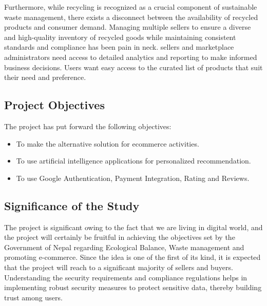 \documentclass[12pt, a4paper, oneside]{article}
\begin{document}
Furthermore, while recycling is recognized as a crucial component of sustainable waste management, there exists a disconnect between the availability of recycled products and consumer demand. Managing multiple sellers to ensure a diverse and high-quality inventory of recycled goods while maintaining consistent standards and compliance has been pain in neck.
sellers and marketplace administrators need access to detailed analytics and reporting to make informed business decisions. Users want easy access to the curated list of products that suit their need and preference.

\pagebreak
\subsection{Project Objectives}
The project has put forward the following objectives:

\begin{itemize}
	\item To make the alternative solution for ecommerce activities.
		\item{ To use artificial intelligence applications for personalized recommendation.}

	 
\item{To use Google Authentication, Payment Integration, Rating and Reviews.}

\end{itemize}

\pagebreak
\subsection{Significance of the Study}
The project is significant owing to the fact that we are living in digital world, and the project will certainly be fruitful in achieving the objectives set by the Government of Nepal regarding Ecological Balance, Waste management and promoting e-commerce. Since the idea is one of the first of its kind, it is expected that the project will reach to a significant majority of sellers and buyers. Understanding the security requirements and compliance regulations helps in implementing robust security measures to protect sensitive data, thereby building trust among users.
\end{document}
